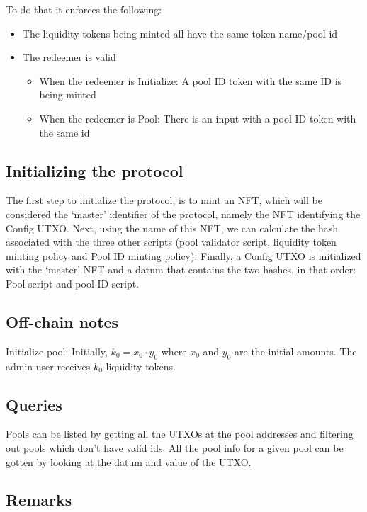 \documentclass{article}
\begin{document}
To do that it enforces the following:
\begin{itemize}
	\item The liquidity tokens being minted all have the same token name/pool id
	\item The redeemer is valid
		\begin{itemize}
			\item When the redeemer is Initialize: A pool ID token with the same ID is being minted
			\item When the redeemer is Pool: There is an input with a pool ID token with the same id
		\end{itemize}
\end{itemize}

\subsection{Initializing the protocol}

The first step to initialize the protocol, is to mint an NFT, which will be
considered the `master' identifier of the protocol, namely the NFT identifying
the Config UTXO. Next, using the name of this NFT, we can calculate the hash
associated with the three other scripts (pool validator script, liquidity token
minting policy and Pool ID minting policy). Finally, a Config UTXO is
initialized with the `master' NFT and a datum that contains the two hashes, in
that order: Pool script and pool ID script.

\subsection{Off-chain notes}

Initialize pool: Initially, $k_0 = x_0 \cdot y_0$ where $x_0$ and $y_0$ are the
initial amounts. The admin user receives $k_0$ liquidity tokens.

\subsection{Queries}

Pools can be listed by getting all the UTXOs at the pool addresses and filtering
out pools which don't have valid ids. All the pool info for a given pool
can be gotten by looking at the datum and value of the UTXO.

\subsection{Remarks}
\end{document}
